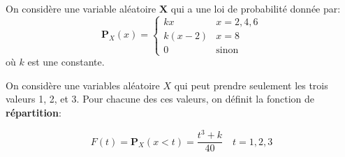 \documentclass[palatino,code]{ensaexam}
\begin{document}
 \begin{questions}
   On considère une variable aléatoire $\mathbf{X}$ qui a une loi de
   probabilité donnée par:
   \begin{equation*}
     \mathbf{P}_X(x) =
    \begin{cases}
      kx & x = 2, 4, 6\\[4pt]
      k(x-2) & x =8\\[4pt]
      0      & \text{sinon}
   \end{cases}
   \end{equation*}
   où $k$ est une constante.

On considère une variables aléatoire $X$ qui peut prendre seulement les trois
valeurs 1, 2, et 3. Pour chacune des ces valeurs, on définit la fonction de
\textbf{répartition}:

\begin{equation*}
  F(t) = \mathbf{P}_X(x < t) = \frac{t^3 + k}{40}\quad t=1,2,3
\end{equation*}

\end{questions}
\end{document}
